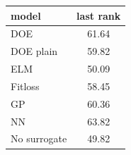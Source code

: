 \begin{tabular}{|lc|}
\hline
model & last rank\\
\hline
DOE & 61.64 \\
DOE plain & 59.82 \\
ELM & 50.09 \\
Fitloss & 58.45 \\
GP & 60.36 \\
NN & 63.82 \\
No surrogate & 49.82 \\
\hline
\end{tabular}
